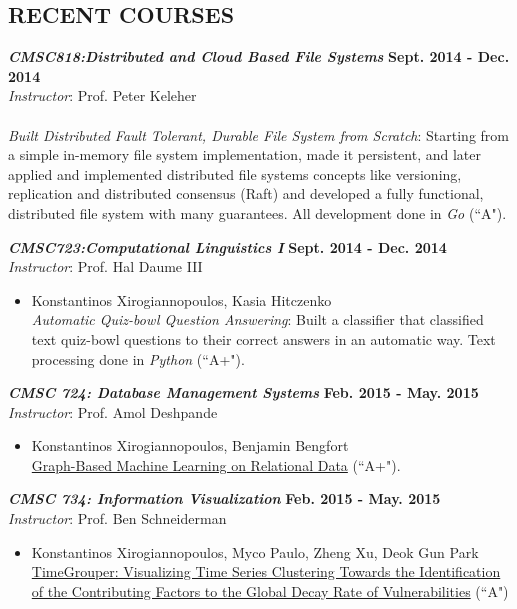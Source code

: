 \documentclass[margin, 10pt]{res} %
\begin{document}
\begin{resume}

\section{RECENT COURSES}

{\sl \textbf{CMSC818:Distributed and Cloud Based File Systems}} \hfill \textbf{Sept. 2014 - Dec. 2014}\\
\textit{Instructor}: Prof. Peter Keleher\\
\\
\textit{Built Distributed Fault Tolerant, Durable File System from Scratch}: Starting from a simple in-memory file system implementation, made it persistent, and later applied and implemented distributed file systems concepts like versioning, replication and distributed consensus (Raft) and developed a fully functional, distributed file system with many guarantees. All development done in \textit{Go} (``A").

{\sl \textbf{CMSC723:Computational Linguistics I}} \hfill \textbf{Sept. 2014 - Dec. 2014}\\
\textit{Instructor}: Prof. Hal Daume III\\
\begin{itemize}
  \item
  Konstantinos Xirogiannopoulos, Kasia Hitczenko\\
  \textit{Automatic Quiz-bowl Question Answering}: Built a classifier that classified text quiz-bowl questions to their correct answers in an automatic way. Text processing done in \textit{Python} (``A+").
\end{itemize}


{\sl \textbf{CMSC 724: Database Management Systems}} \hfill \textbf{Feb. 2015 - May. 2015}\\
\textit{Instructor}: Prof. Amol Deshpande\\
\begin{itemize}
  \item Konstantinos Xirogiannopoulos, Benjamin Bengfort\\
  \href{https://drive.google.com/open?id=0B20MIwp_I7FlUGhyVmFYcjFuYmM}{Graph-Based Machine Learning on Relational Data} (``A+").
\end{itemize}

{\sl \textbf{CMSC 734: Information Visualization}} \hfill \textbf{Feb. 2015 - May. 2015}\\
\textit{Instructor}: Prof. Ben Schneiderman\\
\begin{itemize}
  \item Konstantinos Xirogiannopoulos, Myco Paulo, Zheng Xu, Deok Gun Park\\
  \href{https://wiki.cs.umd.edu/cmsc734_s15/images/f/fc/TimeGrouper_FinalReport.pdf}{TimeGrouper: Visualizing Time Series Clustering Towards the Identification of the Contributing Factors to the Global Decay Rate of Vulnerabilities} (``A")
\end{itemize}



\end{resume}
\end{document}
